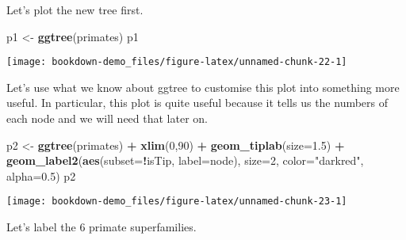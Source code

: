 \documentclass[]{book}
\newenvironment{Shaded}{\begin{snugshade}}{\end{snugshade}}
\newcommand{\KeywordTok}[1]{\textcolor[rgb]{0.13,0.29,0.53}{\textbf{#1}}}
\newcommand{\DataTypeTok}[1]{\textcolor[rgb]{0.13,0.29,0.53}{#1}}
\newcommand{\DecValTok}[1]{\textcolor[rgb]{0.00,0.00,0.81}{#1}}
\newcommand{\FloatTok}[1]{\textcolor[rgb]{0.00,0.00,0.81}{#1}}
\newcommand{\StringTok}[1]{\textcolor[rgb]{0.31,0.60,0.02}{#1}}
\newcommand{\OperatorTok}[1]{\textcolor[rgb]{0.81,0.36,0.00}{\textbf{#1}}}
\newcommand{\NormalTok}[1]{#1}
\begin{document}
Let's plot the new tree first.

\begin{Shaded}
\begin{Highlighting}[]
\NormalTok{p1 <-}\StringTok{ }\KeywordTok{ggtree}\NormalTok{(primates)}
\NormalTok{p1}
\end{Highlighting}
\end{Shaded}

\begin{center}\texttt{[image: bookdown-demo\_files/figure-latex/unnamed-chunk-22-1]} \end{center}

Let's use what we know about ggtree to customise this plot into
something more useful. In particular, this plot is quite useful because
it tells us the numbers of each node and we will need that later on.

\begin{Shaded}
\begin{Highlighting}[]
\NormalTok{p2 <-}\StringTok{ }\KeywordTok{ggtree}\NormalTok{(primates) }\OperatorTok{+}
\StringTok{  }\KeywordTok{xlim}\NormalTok{(}\DecValTok{0}\NormalTok{,}\DecValTok{90}\NormalTok{) }\OperatorTok{+}\StringTok{ }
\StringTok{  }\KeywordTok{geom_tiplab}\NormalTok{(}\DataTypeTok{size=}\FloatTok{1.5}\NormalTok{) }\OperatorTok{+}
\StringTok{  }\KeywordTok{geom_label2}\NormalTok{(}\KeywordTok{aes}\NormalTok{(}\DataTypeTok{subset=}\OperatorTok{!}\NormalTok{isTip, }\DataTypeTok{label=}\NormalTok{node), }\DataTypeTok{size=}\DecValTok{2}\NormalTok{, }\DataTypeTok{color=}\StringTok{"darkred"}\NormalTok{, }\DataTypeTok{alpha=}\FloatTok{0.5}\NormalTok{)}
\NormalTok{p2}
\end{Highlighting}
\end{Shaded}

\begin{center}\texttt{[image: bookdown-demo\_files/figure-latex/unnamed-chunk-23-1]} \end{center}

Let's label the 6 primate superfamilies.
\end{document}
